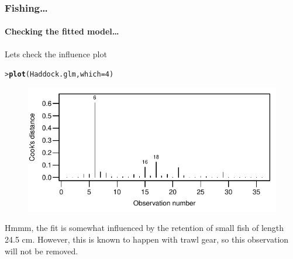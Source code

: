 \documentclass{beamer}\usepackage[]{graphicx}\usepackage[]{xcolor}
\makeatletter
\newcommand{\hlnum}[1]{\textcolor[rgb]{0.686,0.059,0.569}{#1}}%
\newcommand{\hlstd}[1]{\textcolor[rgb]{0.345,0.345,0.345}{#1}}%
\newcommand{\hlkwc}[1]{\textcolor[rgb]{0.333,0.667,0.333}{#1}}%
\newcommand{\hlkwd}[1]{\textcolor[rgb]{0.737,0.353,0.396}{\textbf{#1}}}%
\newenvironment{kframe}{%
 \def\at@end@of@kframe{}%
 \ifinner\ifhmode%
  \def\at@end@of@kframe{\end{minipage}}%
  \begin{minipage}{\columnwidth}%
 \fi\fi%
 \def\FrameCommand##1{\hskip\@totalleftmargin \hskip-\fboxsep
 \colorbox{shadecolor}{##1}\hskip-\fboxsep
     \hskip-\linewidth \hskip-\@totalleftmargin \hskip\columnwidth}%
 \MakeFramed {\advance\hsize-\width
   \@totalleftmargin\z@ \linewidth\hsize
   \@setminipage}}%
 {\par\unskip\endMakeFramed%
 \at@end@of@kframe}
\newenvironment{knitrout}{}{} %
\makeatother
\begin{document}
\begin{frame}[fragile]
\frametitle{Fishing\ldots}
\framesubtitle{Checking the fitted model\ldots}
Lets check the influence plot
\begin{knitrout}\scriptsize
{}\color{fgcolor}\begin{kframe}
\begin{alltt}
\hlstd{> }\hlkwd{plot}\hlstd{(Haddock.glm,}\hlkwc{which}\hlstd{=}\hlnum{4}\hlstd{)}
\end{alltt}
\end{kframe}
\end{knitrout}

\begin{figure}
  \centering
  \includegraphics{figure/RC-H15-041b}
\end{figure}

Hmmm, the fit is somewhat influenced by the retention of small fish of length 24.5 cm. However, this is known to happen with trawl gear, so this observation will not be removed.
\end{frame}
\end{document}
